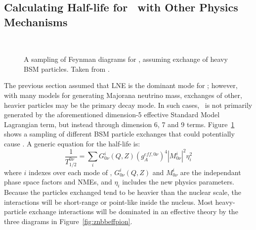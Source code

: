 \documentclass[/main.tex]{subfiles}
\begin{document}
\subsection{Calculating Half-life for \znbb\ with Other Physics Mechanisms}
\begin{figure}[t]
  \centering
  \\
  \caption[\znbb\ Diagrams from Heavy BSM Mechanisms]{\label{fig:znbbheavy}
    A sampling of Feynman diagrams for \znbb, assuming exchange of heavy BSM particles. Taken from \cite{Rodejohann2015}.
  }
\end{figure}
The previous section assumed that LNE is the dominant mode for \znbb; however, with many models for generating Majorana neutrino mass, exchanges of other, heavier particles may be the primary decay mode.
In such cases, \znbb\ is not primarily generated by the aforementioned dimension-5 effective Standard Model Lagrangian term, but instead through dimension 6, 7 and 9 terms\cite{Cirigliano2018}.
Figure~\ref{fig:znbbheavy} shows a sampling of different BSM particle exchanges that could potentially cause \znbb.
A generic equation for the half-life is:
\begin{equation}
  \frac{1}{T^{0\nu}_{1/2}}=\sum_iG^i_{0\nu}(Q,Z)(g_A^{eff,0\nu})^4|M^i_{0\nu}|^2\eta_i^2
\end{equation}
where $i$ indexes over each mode of \znbb, $G^i_{0\nu}(Q,Z)$ and $M^i_{0\nu}$ are the independant phase space factors and NMEs, and $\eta_i$ includes the new physics parameters.
Because the particles exchanged tend to be heavier than the nuclear scale, the interactions will be short-range or point-like inside the nucleus.
Most heavy-particle exchange interactions will be dominated in an effective theory by the three diagrams in Figure~\ref{fig:znbbeffpion}.
\end{document}
